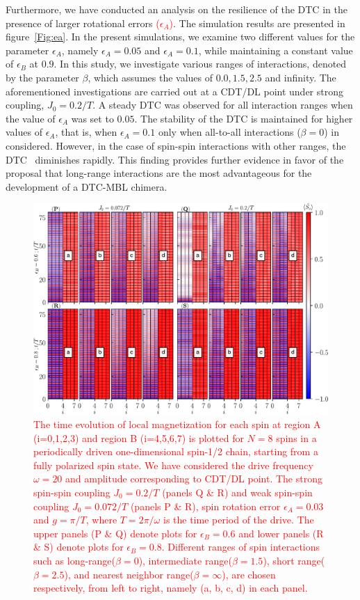 \documentclass[12pt]{iopart}
\newcommand{\red}[1]{\textcolor{red}{#1}}
\begin{document}
Furthermore, we have conducted an analysis on the resilience of the DTC in the presence of larger rotational errors \red{($\epsilon_A$)}. The simulation results are presented in figure~\ref{Fig:ea}. In the present simulations, we examine two different values for the parameter $\epsilon_A$, namely $\epsilon_A = 0.05$ and $\epsilon_A = 0.1$, while maintaining a constant value of $\epsilon_B$ at $0.9$. In this study, we investigate various ranges of interactions, denoted by the parameter $\beta$, which assumes the values of $0.0, 1.5, 2.5$ and infinity. The aforementioned investigations are carried out at a CDT/DL point under strong coupling, $J_0 = 0.2/T$.  A steady DTC was observed for all interaction ranges when the value of $\epsilon_A$ was set to $0.05$. The stability of the DTC is maintained for higher values of $\epsilon_A$, that is, when $\epsilon_A = 0.1$ only when all-to-all interactions ($\beta=0$) in considered. However, in the case of spin-spin interactions with other ranges, the DTC  diminishes rapidly. This finding provides further evidence in favor of the proposal that long-range interactions are the most advantageous for the development of a DTC-MBL chimera.
\begin{figure}[t!]
	\centering
	\hspace{2cm}\includegraphics[width=13.5cm]{figure7.pdf}
	\caption{\red{The time evolution of local magnetization for each spin at region A (i=0,1,2,3) and region B (i=4,5,6,7) is plotted for $N=8$ spins in a periodically driven one-dimensional spin-1/2 chain, starting from a fully polarized spin state. We have considered the drive frequency $\omega=20$ and amplitude corresponding to CDT/DL point. The strong spin-spin coupling $J_0 = 0.2/T$ (panels Q \& R) and weak spin-spin coupling $J_0 = 0.072/T$ (panels P \& R),  spin rotation error $\epsilon_A = 0.03$ and $g=\pi/T$, where $T=2\pi/\omega$ is the time period of the drive. The upper panels (P \& Q) denote plots for $\epsilon_B=0.6$ and lower panels (R \& S) denote plots for $\epsilon_B=0.8$. Different ranges of spin interactions such as long-range($\beta=0$), intermediate range($\beta=1.5$), short range($\beta=2.5$), and nearest neighbor range($\beta=\infty$), are chosen respectively, from left to right, namely (a, b, c, d) in each panel.}}
	\label{Fig:eb}
\end{figure}
\end{document}
